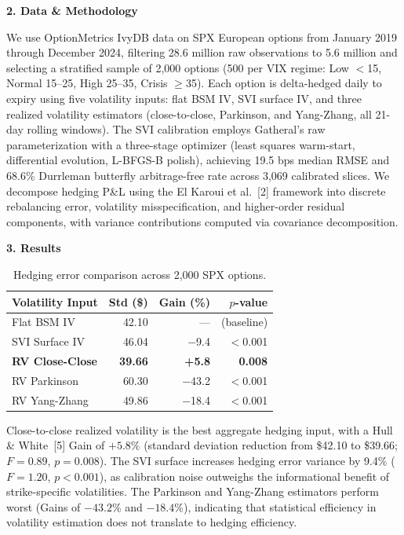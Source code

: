\documentclass[10pt, twocolumn, letterpaper]{article}
\begin{document}
\textbf{2. Data \& Methodology}

We use OptionMetrics IvyDB data on SPX European options from January 2019 through December 2024, filtering 28.6 million raw observations to 5.6 million and selecting a stratified sample of 2,000 options (500 per VIX regime: Low $<$15, Normal 15--25, High 25--35, Crisis $\geq$35). Each option is delta-hedged daily to expiry using five volatility inputs: flat BSM IV, SVI surface IV, and three realized volatility estimators (close-to-close, Parkinson, and Yang-Zhang, all 21-day rolling windows). The SVI calibration employs Gatheral's raw parameterization with a three-stage optimizer (least squares warm-start, differential evolution, L-BFGS-B polish), achieving 19.5 bps median RMSE and 68.6\% Durrleman butterfly arbitrage-free rate across 3,069 calibrated slices. We decompose hedging P\&L using the El Karoui et al.~[2] framework into discrete rebalancing error, volatility misspecification, and higher-order residual components, with variance contributions computed via covariance decomposition.

\textbf{3. Results}

\begin{table}[h]
\centering\footnotesize
\caption{Hedging error comparison across 2,000 SPX options.}
\begin{tabular}{@{}lrrr@{}}
\toprule
Volatility Input & Std (\$) & Gain (\%) & $p$-value \\
\midrule
Flat BSM IV & 42.10 & --- & (baseline) \\
SVI Surface IV & 46.04 & $-$9.4 & $<$0.001 \\
\textbf{RV Close-Close} & \textbf{39.66} & \textbf{+5.8} & \textbf{0.008} \\
RV Parkinson & 60.30 & $-$43.2 & $<$0.001 \\
RV Yang-Zhang & 49.86 & $-$18.4 & $<$0.001 \\
\bottomrule
\end{tabular}
\end{table}

Close-to-close realized volatility is the best aggregate hedging input, with a Hull \& White~[5] Gain of $+5.8\%$ (standard deviation reduction from \$42.10 to \$39.66; $F = 0.89$, $p = 0.008$). The SVI surface increases hedging error variance by 9.4\% ($F = 1.20$, $p < 0.001$), as calibration noise outweighs the informational benefit of strike-specific volatilities. The Parkinson and Yang-Zhang estimators perform worst (Gains of $-43.2\%$ and $-18.4\%$), indicating that statistical efficiency in volatility estimation does not translate to hedging efficiency.
\end{document}
